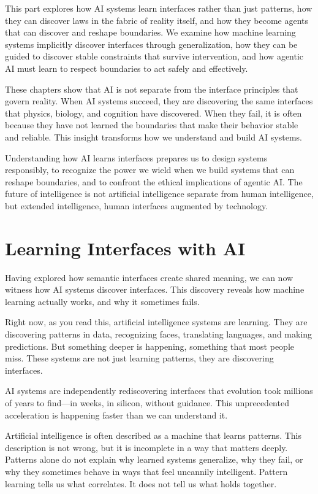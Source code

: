 \documentclass[
  openright]{book}
\begin{document}
This part explores how AI systems learn interfaces rather than just
patterns, how they can discover laws in the fabric of reality itself,
and how they become agents that can discover and reshape boundaries. We
examine how machine learning systems implicitly discover interfaces
through generalization, how they can be guided to discover stable
constraints that survive intervention, and how agentic AI must learn to
respect boundaries to act safely and effectively.

These chapters show that AI is not separate from the interface
principles that govern reality. When AI systems succeed, they are
discovering the same interfaces that physics, biology, and cognition
have discovered. When they fail, it is often because they have not
learned the boundaries that make their behavior stable and reliable.
This insight transforms how we understand and build AI systems.

Understanding how AI learns interfaces prepares us to design systems
responsibly, to recognize the power we wield when we build systems that
can reshape boundaries, and to confront the ethical implications of
agentic AI. The future of intelligence is not artificial intelligence
separate from human intelligence, but extended intelligence, human
interfaces augmented by technology.

\chapter{\texorpdfstring{Learning Interfaces with
AI}{Learning Interfaces with AI}}\label{learning-interfaces-with-ai}

Having explored how semantic interfaces create shared meaning, we can
now witness how AI systems discover interfaces. This discovery reveals
how machine learning actually works, and why it sometimes fails.

Right now, as you read this, artificial intelligence systems are
learning. They are discovering patterns in data, recognizing faces,
translating languages, and making predictions. But something deeper is
happening, something that most people miss. These systems are not just
learning patterns, they are discovering interfaces.

AI systems are independently rediscovering interfaces that evolution
took millions of years to find---in weeks, in silicon, without guidance.
This unprecedented acceleration is happening faster than we can
understand it.

Artificial intelligence is often described as a machine that learns
patterns. This description is not wrong, but it is
incomplete in a way that matters deeply. Patterns alone do not explain
why learned systems generalize, why they fail, or why they sometimes
behave in ways that feel uncannily intelligent. Pattern learning tells
us what correlates. It does not tell us what holds together.
\end{document}
